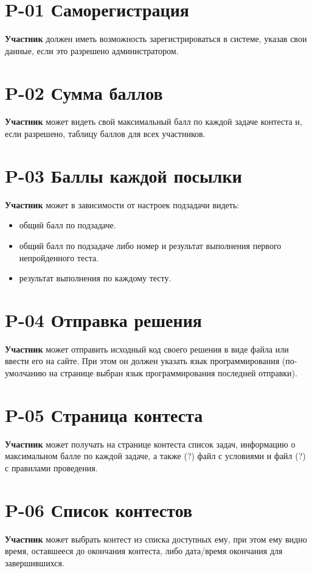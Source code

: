 \documentclass{book}
\begin{document}
\section*{P-01 Саморегистрация}
\textbf{Участник} должен иметь возможность зарегистрироваться в системе, указав свои 
данные, если это разрешено администратором.

\newpage \section*{P-02 Сумма баллов}
\textbf{Участник} может видеть свой максимальный балл по каждой задаче контеста и,
если разрешено, таблицу баллов для всех участников.

\newpage \section*{P-03 Баллы каждой посылки}
\textbf{Участник} может в зависимости от настроек подзадачи видеть:
\begin{itemize}\setlength{\itemsep}{0pt}
\item общий балл по подзадаче.
\item общий балл по подзадаче либо номер и результат выполнения первого непройденного теста.
\item результат выполнения по каждому тесту.
\end{itemize}

\newpage \section*{P-04 Отправка решения}
\textbf{Участник} может отправить исходный код своего решения в виде файла или ввести 
его на сайте. При этом он должен указать язык программирования (по-умолчанию
на странице выбран язык программирования последней отправки).

\newpage \section*{P-05 Страница контеста }
\textbf{Участник} может получать на странице контеста список задач, информацию о 
максимальном балле по каждой задаче, а также (?) файл с условиями и файл (?) с 
правилами проведения.

\newpage \section*{P-06 Список контестов }
\textbf{Участник} может выбрать контест из списка доступных ему, при этом ему видно 
время, оставшееся до окончания контеста, либо дата/время окончания для 
завершившихся.
\end{document}
